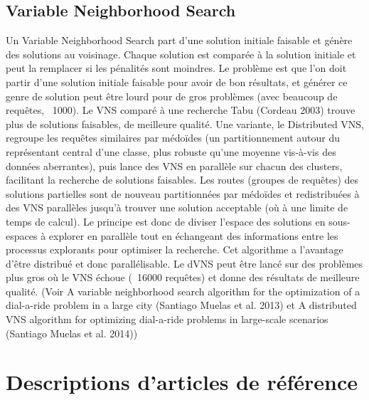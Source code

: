 \documentclass[10pt,a4paper]{report}
\begin{document}
\subsection*{Variable Neighborhood Search}
Un Variable Neighborhood Search part d'une solution initiale faisable et génère des solutions au voisinage. Chaque solution est comparée à la solution initiale et peut la remplacer si les pénalités sont moindres. Le problème est que l'on doit partir d'une solution initiale faisable pour avoir de bon résultats, et générer ce genre de solution peut être lourd pour de gros problèmes (avec beaucoup de requêtes, ~1000). 
Le VNS comparé à une recherche Tabu (Cordeau 2003) trouve plus de solutions faisables, de meilleure qualité. 
Une variante, le Distributed VNS, regroupe les requêtes similaires par médoïdes (un partitionnement autour du représentant central d'une classe, plus robuste qu'une moyenne vis-à-vis des données aberrantes), puis lance des VNS en parallèle sur chacun des clusters, facilitant la recherche de solutions faisables. Les routes (groupes de requêtes) des solutions partielles sont de nouveau partitionnées par médoïdes et redistribuées à des VNS parallèles jusqu'à trouver une solution acceptable (où à une limite de temps de calcul). 
Le principe est donc de diviser l'espace des solutions en sous-espaces à explorer en parallèle tout en échangeant des informations entre les processus explorants pour optimiser la recherche.
Cet algorithme a l'avantage d'être distribué et donc parallélisable. 
Le dVNS peut être lancé sur des problèmes plus gros où le VNS échoue (~16000 requêtes) et donne des résultats de meilleure qualité. 
(Voir A variable neighborhood search algorithm for the optimization of a dial-a-ride problem in a large city (Santiago Muelas et al. 2013) et A distributed VNS algorithm for optimizing dial-a-ride problems in large-scale scenarios (Santiago Muelas et al. 2014))

\section*{Descriptions d'articles de référence}
\end{document}
